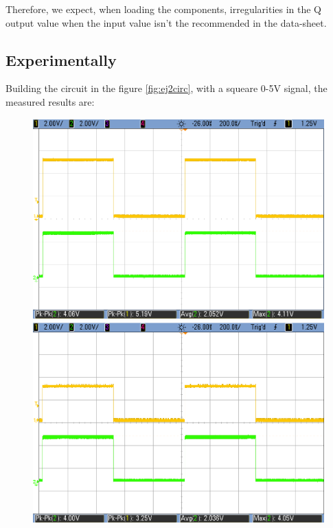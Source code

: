 	\pagebreak
	
	Therefore, we expect, when loading the components, irregularities in the Q output value when the input value isn't the recommended in the data-sheet. 

	\subsection{\color{purple}Experimentally}
	
	Building the circuit in the figure \ref{fig:ej2circ}, with a squeare 0-5V signal, the measured results are:
	
	\begin{figure}[h!]
        \centering
        \includegraphics[scale=0.19]{../Exercise2/HC-LS-5V.png}\hspace{1cm}
        \includegraphics[scale=0.19]{../Exercise2/HC-LS-3V.png}\\

\end{figure}
